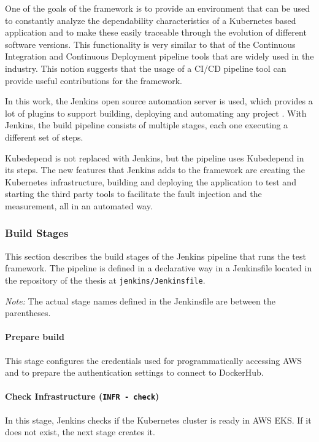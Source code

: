 One of the goals of the framework is to provide an environment that can be used to constantly analyze the dependability characteristics of a Kubernetes based application and to make these easily traceable through the evolution of different software versions. This functionality is very similar to that of the Continuous Integration and Continuous Deployment pipeline tools that are widely used in the industry. This notion suggests that the usage of a CI/CD pipeline tool can provide useful contributions for the framework.

In this work, the Jenkins open source automation server is used, which provides a lot of plugins to support building, deploying and automating any project \cite{Jenkins}. With Jenkins, the build pipeline consists of multiple stages, each one executing a different set of steps.
 
Kubedepend is not replaced with Jenkins, but the pipeline uses Kubedepend in its steps. The new features that Jenkins adds to the framework are creating the Kubernetes infrastructure, building and deploying the application to test and starting the third party tools to facilitate the fault injection and the measurement, all in an automated way.

\subsubsection{Build Stages}

This section describes the build stages of the Jenkins pipeline that runs the test framework. The pipeline is defined in a declarative way in a Jenkinsfile located in the repository of the thesis \cite{ThesisRepo} at \texttt{jenkins/Jenkinsfile}.

\emph{Note:} The actual stage names defined in the Jenkinsfile are between the parentheses.

\paragraph{Prepare build} This stage configures the credentials used for programmatically accessing AWS and to prepare the authentication settings to connect to DockerHub.

\paragraph{Check Infrastructure (\texttt{INFR - check})} In this stage, Jenkins checks if the Kubernetes cluster is ready in AWS EKS. If it does not exist, the next stage creates it.

